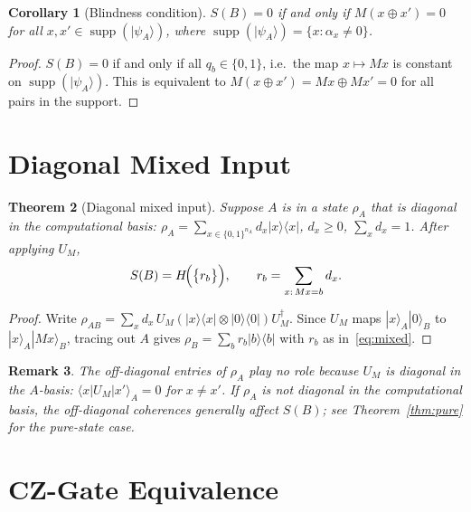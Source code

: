 \documentclass[11pt,a4paper]{article}
\newtheorem{theorem}{Theorem}[section]
\newtheorem{corollary}[theorem]{Corollary}
\newtheorem{remark}[theorem]{Remark}
\newcommand{\VNE}{S}
\newcommand{\supp}{\operatorname{supp}}
\begin{document}
\begin{corollary}[Blindness condition]
\label{cor:blind}
$\VNE(B) = 0$ if and only if $M(x \oplus x') = 0$ for all
$x, x' \in \supp(|\psi_A\rangle)$, where
$\supp(|\psi_A\rangle) = \{x : \alpha_x \neq 0\}$.
\end{corollary}

\begin{proof}
$\VNE(B) = 0$ if and only if all $q_b \in \{0, 1\}$, i.e.\ the map
$x \mapsto Mx$ is constant on $\supp(|\psi_A\rangle)$.  This is equivalent
to $M(x \oplus x') = Mx \oplus Mx' = 0$ for all pairs in the support.
\end{proof}

\section{Diagonal Mixed Input}
\label{sec:mixed}

\begin{theorem}[Diagonal mixed input]
\label{thm:mixed}
Suppose $A$ is in a state $\rho_A$ that is diagonal in the computational
basis: $\rho_A = \sum_{x \in \{0,1\}^{n_A}} d_x |x\rangle\langle x|$,
$d_x \geq 0$, $\sum_x d_x = 1$.  After applying $U_M$,
\begin{equation}
  \VNE(B) = H\!\Bigl(\bigl\{r_b\bigr\}\Bigr),
  \qquad
  r_b = \sum_{x:\, Mx = b} d_x.
  \label{eq:mixed}
\end{equation}
\end{theorem}

\begin{proof}
Write $\rho_{AB} = \sum_x d_x\, U_M(|x\rangle\langle x| \otimes |0\rangle\langle 0|)U_M^\dagger$.
Since $U_M$ maps $|x\rangle_A|0\rangle_B$ to $|x\rangle_A|Mx\rangle_B$,
tracing out $A$ gives $\rho_B = \sum_b r_b |b\rangle\langle b|$
with $r_b$ as in~\eqref{eq:mixed}.
\end{proof}

\begin{remark}
The off-diagonal entries of $\rho_A$ play no role because $U_M$ is diagonal
in the $A$-basis: $\langle x|U_M|x'\rangle_A = 0$ for $x \neq x'$.
If $\rho_A$ is \emph{not} diagonal in the computational basis,
the off-diagonal coherences generally affect $\VNE(B)$; see Theorem~\ref{thm:pure}
for the pure-state case.
\end{remark}

\section{CZ-Gate Equivalence}
\label{sec:cz}
\end{document}

